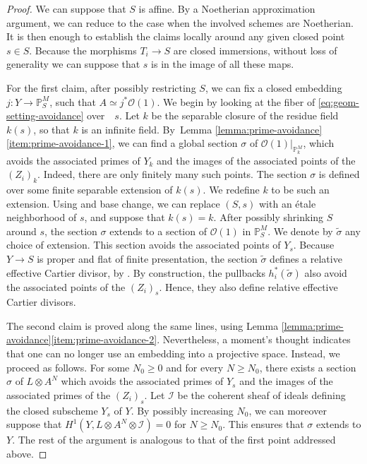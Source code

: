 \documentclass[JEP,XML,SOM,Unicode,published]{cedram}
\theoremstyle{plain}
\theoremstyle{definition}
\newcommand{\PBbb}{\mathbb P}
\newcommand{\Ical}{\mathcal I}
\newcommand{\Ocal}{\mathcal O}
\begin{document}
\begin{proof}
We can suppose that $S$ is affine. By a Noetherian approximation argument, we can reduce to the case when the involved schemes are Noetherian. It is then enough to establish the claims locally around any given closed point $s\in S$. Because the morphisms $T_{i}\to S$ are closed immersions, without loss of generality we can suppose that $s$ is in the image of all these maps.

For the first claim, after possibly restricting $S$, we can fix a closed embedding $j\colon Y\to\PBbb^{M}_{S}$, such that $A\simeq j^{\ast}\Ocal(1)$. We begin by looking at the fiber of \eqref{eq:geom-setting-avoidance} over~ $s$. Let $k$ be the separable closure of the residue field $k(s)$, so that $k$ is an infinite field. By~Lemma \ref{lemma:prime-avoidance}\eqref{item:prime-avoidance-1}, we can find a global section $\sigma$ of $\Ocal(1)|_{\PBbb^{M}_{k}}$, which avoids the associated primes of $Y_{k}$ and the images of the associated points of the $(Z_{i})_{k}$. Indeed, there are only finitely many such points. The section $\sigma$ is defined over some finite separable extension of $k(s)$. We redefine $k$ to be such an extension. Using \cite[\href{https://stacks.math.columbia.edu/tag/01ZM}{02LF}]{stacks-project} and base change, we can replace $(S,s)$ with an étale neighborhood of $s$, and suppose that $k(s)=k$. After possibly shrinking $S$ around $s$, the section $\sigma$ extends to a section of $\Ocal(1)$ in $\PBbb^{M}_{S}$. We denote by $\widetilde{\sigma}$ any choice of extension. This section avoids the associated points of $Y_{s}$. Because $Y\to S$ is proper and flat of finite presentation, the section $\widetilde{\sigma}$ defines a relative effective Cartier divisor, by \cite[Prop.\,11.3.7 \& Th.\,11.3.8]{EGAIV3}. By construction, the pullbacks $h_{i}^{\ast}(\widetilde{\sigma})$ also avoid the associated points of the $(Z_{i})_{s}$. Hence, they also define relative effective Cartier divisors.

The second claim is proved along the same lines, using Lemma \ref{lemma:prime-avoidance}\eqref{item:prime-avoidance-2}. Nevertheless, a moment's thought indicates that one can no longer use an embedding into a projective space. Instead, we proceed as follows. For some $N_{0}\geq 0$ and for every $N\geq N_{0}$, there exists a section $\sigma$ of $L\otimes A^{N}$ which avoids the associated primes of $Y_{s}$ and the images of the associated primes of the $(Z_{i})_{s}$. Let $\Ical$ be the coherent sheaf of ideals defining the closed subscheme $Y_{s}$ of $Y$. By possibly increasing $N_{0}$, we can moreover suppose that $H^{1}(Y, L\otimes A^{N}\otimes\Ical)=0$ for $N\geq N_{0}$. This ensures that $\sigma$ extends to $Y$. The rest of the argument is analogous to that of the first point addressed above.
\end{proof}
\end{document}
